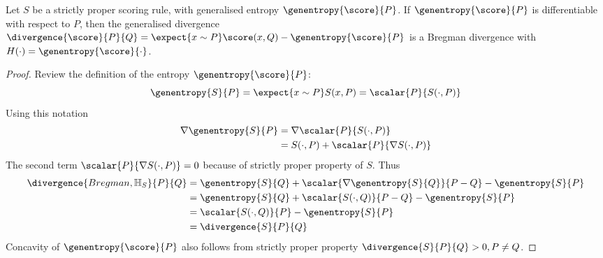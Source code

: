 \begin{statement}
	Let $S$ be a strictly proper scoring rule, with generalised entropy $\genentropy{\score}{P}$. If $\genentropy{\score}{P}$ is differentiable with respect to $P$, then the generalised divergence $\divergence{\score}{P}{Q} = \expect{x\sim P}\score(x,Q) - \genentropy{\score}{P}$ is a Bregman divergence with $H(\cdot) = \genentropy{\score}{\cdot}$.
\begin{proof}
	Review the definition of the entropy $\genentropy{\score}{P}$:
		\begin{equation}
			\genentropy{S}{P} = \expect{x \sim P}S(x,P) = \scalar{P}{S(\cdot,P)}
		\end{equation}
		Using this notation
		\begin{align}
			\nabla\genentropy{S}{P} &=  \nabla\scalar{P}{S(\cdot,P)}\\
				&= S(\cdot,P) + \scalar{P}{\nabla S(\cdot,P)}
		\end{align}
	The second term $\scalar{P}{\nabla S(\cdot,P)}=0$ because of strictly proper property of $S$. Thus
 		\begin{align}
 		 	\divergence{Bregman,\mathbb{H}_{S}}{P}{Q}&= \genentropy{S}{Q}  + \scalar{\nabla \genentropy{S}{Q}}{P-Q} -  \genentropy{S}{P} \\
 		 		&= \genentropy{S}{Q} + \scalar{S(\cdot,Q)}{P - Q} -  \genentropy{S}{P}\\
 		 		&= \scalar{S(\cdot,Q)}{P} - \genentropy{S}{P}\\
 		 		&= \divergence{S}{P}{Q}
 		\end{align}
 		Concavity of $\genentropy{\score}{P}$ also follows from strictly proper property $\divergence{S}{P}{Q}>0,P\neq Q$.
\end{proof}
\end{statement}

